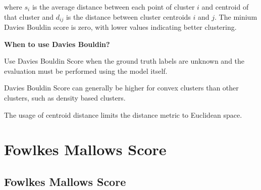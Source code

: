 \begin{center}

\end{center}


where $s_{i}$ is the average distance between each point of cluster $i$ and centroid of that cluster and $d_{ij}$ is the distance between cluster centroids $i$ and $j$. The minium Davies Bouldin score is zero, with lower values indicating better clustering.

\textbf{When to use Davies Bouldin?}

Use Davies Bouldin Score when the ground truth labels are unknown and the evaluation must be performed using the model itself.

{
\item Davies Bouldin Score can generally be higher for convex clusters than other clusters, such as density based clusters.
\item The usage of centroid distance limits the distance metric to Euclidean space.
}

\clearpage
\thispagestyle{clusteringstyle}
\section{Fowlkes Mallows Score}
\subsection{Fowlkes Mallows Score}

